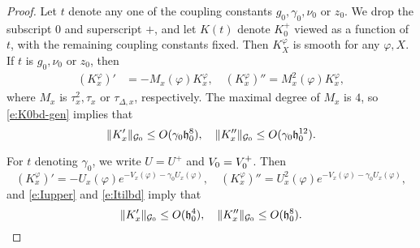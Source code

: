 \begin{proof}
Let $t$ denote any one of the coupling constants $g_0, \gamma_0, \nu_0$ or $z_0$.
We drop the subscript $0$ and superscript $+$, and let $K(t)$ denote $K^+_0$ viewed as a function of $t$,
with the remaining coupling constants fixed. Then $K^\varphi_X$ is smooth for any $\varphi, X$.
If $t$ is $g_0, \nu_0$ or $z_0$, then
\begin{align}
(K^\varphi_x)'  &= -M_x(\varphi) K^\varphi_x, \quad
(K^\varphi_x)'' = M_x^2(\varphi) K^\varphi_x,
\end{align}
where $M_x$ is $\tau_x^2, \tau_x$ or $\tau_{\Delta,x}$, respectively.
The maximal degree of $M_x$ is $4$, so
\eqref{e:K0bd-gen} implies that
\begin{equation}
\label{e:Kprime-bd1}
\|K'_x\|_{\mathcal{G}_0} \le O(\gamma_0 \mathfrak{h}_0^{8}),
  \quad
\|K''_x\|_{\mathcal{G}_0} \le O(\gamma_0 \mathfrak{h}_0^{12}).
\end{equation}

For $t$ denoting $\gamma_0$, we
write $U = U^+$
and $V_0 = V^+_0$.
Then
\begin{equation}
\label{e:dKdgamma0}
(K^\varphi_x)'  = -U_x(\varphi) e^{-V_x(\varphi) - \gamma_0 U_x(\varphi)}, \quad
(K^\varphi_x)'' = U_x^2(\varphi) e^{-V_x(\varphi) - \gamma_0 U_x(\varphi)},
\end{equation}
and \eqref{e:Iupper} and \eqref{e:Itilbd} imply that
\begin{equation}
\label{e:Kprime-bd2}
\|K'_x\|_{\mathcal{G}_0} \le O(\mathfrak{h}_0^4),
  \quad
\|K''_x\|_{\mathcal{G}_0} \le O(\mathfrak{h}_0^8).
\end{equation}


\end{proof}
